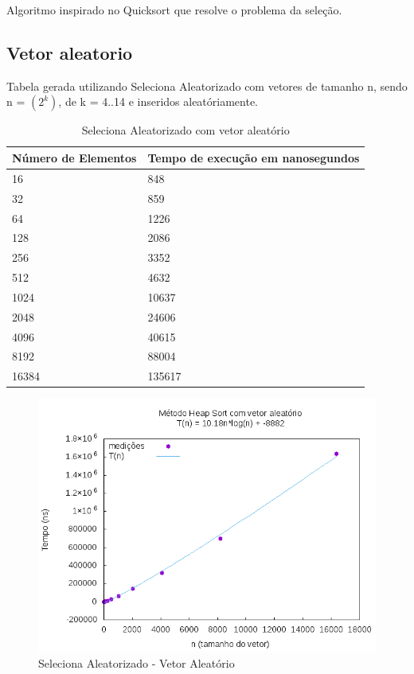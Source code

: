 \documentclass[12pt,a4paper,twoside]{report}
\begin{document}
Algoritmo inspirado no Quicksort que resolve o problema da seleção.

\subsection{Vetor aleatorio}
Tabela gerada utilizando Seleciona Aleatorizado com vetores de tamanho n, sendo n = $(2^k)$, de k = 4..14 e inseridos aleatóriamente.
\begin{table}[H]
\centering
\caption{Seleciona Aleatorizado com vetor aleatório}
\label{my-label}
\begin{tabular}{|l|l|}
\hline
\multicolumn{1}{|c|}{\textbf{Número de Elementos}} & \multicolumn{1}{c|}{\textbf{Tempo de execução em nanosegundos}} \\ \hline
16 & 848 \\ \hline
32 & 859 \\ \hline
64 & 1226 \\ \hline
128 & 2086 \\ \hline
256 & 3352 \\ \hline
512 & 4632 \\ \hline
1024 & 10637 \\ \hline
2048 & 24606 \\ \hline
4096 & 40615 \\ \hline
8192 & 88004 \\ \hline
16384 & 135617 \\ \hline

\end{tabular}
\end{table}

\begin{figure}[H]
    \centering
    \includegraphics[width=0.7\linewidth]{graficos/HeapSort/vIntAleatorio/vIntAleatorio.png}
  \caption{Seleciona Aleatorizado - Vetor Aleatório}
\end{figure}
\end{document}
